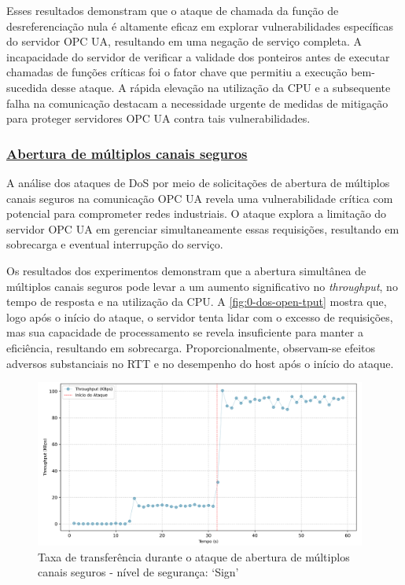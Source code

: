             Esses resultados demonstram que o ataque de chamada da função de desreferenciação nula é altamente eficaz em explorar vulnerabilidades específicas do servidor OPC UA, resultando em uma negação de serviço completa. A incapacidade do servidor de verificar a validade dos ponteiros antes de executar chamadas de funções críticas foi o fator chave que permitiu a execução bem-sucedida desse ataque. A rápida elevação na utilização da CPU e a subsequente falha na comunicação destacam a necessidade urgente de medidas de mitigação para proteger servidores OPC UA contra tais vulnerabilidades.

        \subsubsection*{\underline{Abertura de múltiplos canais seguros}}

            A análise dos ataques de DoS por meio de solicitações de abertura de múltiplos canais seguros na comunicação OPC UA revela uma vulnerabilidade crítica com potencial para comprometer redes industriais. O ataque explora a limitação do servidor OPC UA em gerenciar simultaneamente essas requisições, resultando em sobrecarga e eventual interrupção do serviço.

            Os resultados dos experimentos demonstram que a abertura simultânea de múltiplos canais seguros pode levar a um aumento significativo no \textit{throughput}, no tempo de resposta e na utilização da CPU. A \autoref{fig:0-dos-open-tput} mostra que, logo após o início do ataque, o servidor tenta lidar com o excesso de requisições, mas sua capacidade de processamento se revela insuficiente para manter a eficiência, resultando em sobrecarga. Proporcionalmente, observam-se efeitos adversos substanciais no RTT e no desempenho do host após o início do ataque.

            \begin{figure}[htbp!]
                \caption{\label{fig:0-dos-open-tput}Taxa de transferência durante o ataque de abertura de múltiplos canais seguros - nível de segurança: `Sign'}
                \begin{center}
                    \includegraphics[width=0.972\textwidth]{USPSC-img/output/cropped/1-dos_open_multiple_secure_channels-tput.png}
                \end{center}
            \end{figure}

